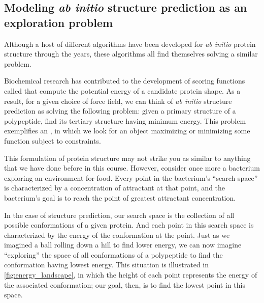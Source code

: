 \subsection{Modeling \textit{ab initio} structure prediction as an exploration problem}

Although a host of different algorithms have been developed for \textit{ab initio} protein structure through the years, these algorithms all find themselves solving a similar problem.

Biochemical research has contributed to the development of scoring functions called  that compute the potential energy of a candidate protein shape. As a result, for a given choice of force field, we can think of \textit{ab initio} structure prediction as solving the following problem: given a primary structure of a polypeptide, find its tertiary structure having minimum energy. This problem exemplifies an , in which we look for an object maximizing or minimizing some function subject to constraints.

This formulation of protein structure may not strike you as similar to anything that we have done before in this course. However, consider once more a bacterium exploring an environment for food. Every point in the bacterium's ``search space'' is characterized by a concentration of attractant at that point, and the bacterium's goal is to reach the point of greatest attractant concentration.

In the case of structure prediction, our search space is the collection of all possible conformations of a given protein. And each point in this search space is characterized by the energy of the conformation at the point. Just as we imagined a ball rolling down a hill to find lower energy, we can now imagine ``exploring'' the space of all conformations of a polypeptide to find the conformation having lowest energy. This situation is illustrated in \autoref{fig:energy_landscape}, in which the height of each point represents the energy of the associated conformation; our goal, then, is to find the lowest point in this space.\\

